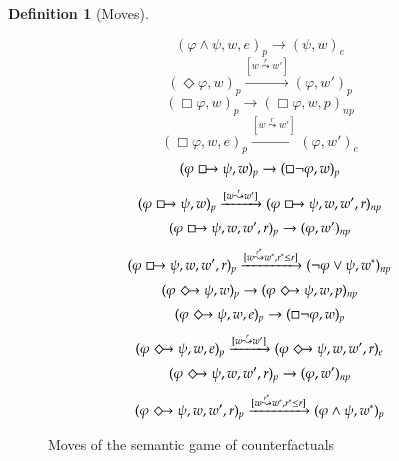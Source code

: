 \documentclass[a4paper,american]{paper}
\theoremstyle{definition}\newtheorem{definition}{Definition}
\begin{document}
\begin{definition}[Moves]
\begin{figure}[H]
	\begin{equation}
		(\varphi\wedge\psi ,w,e)_{p}\rightarrow (\psi ,w)_{e}
	\end{equation}
	\begin{equation}
		(\Diamond\varphi ,w)_{p}\xrightarrow{[w\overset{r}{\leadsto}w']} (\varphi ,w')_{p}
	\end{equation}
	\begin{equation}
		(\Box\varphi ,w)_{p}\rightarrow (\Box\varphi ,w,p)_{np}
	\end{equation}
	\begin{equation}
		(\Box\varphi ,w,e)_{p}\xrightarrow{[w\overset{r}{\leadsto}w']} (\varphi ,w')_{e}
	\end{equation}
	\begin{equation}
		(\varphi\boxright\psi ,w)_p\rightarrow (\Box\neg\varphi ,w)_{p}
	\end{equation}
	\begin{equation}
		(\varphi\boxright\psi ,w)_p\xrightarrow{[w\overset{r}{\leadsto}w']}(\varphi\boxright\psi ,w,w',r)_{np}
	\end{equation}
	\begin{equation}
		(\varphi\boxright\psi ,w,w',r)_p\rightarrow (\varphi ,w')_{np}
	\end{equation}
	\begin{equation}
		(\varphi\boxright\psi ,w,w',r)_p\xrightarrow{[w\overset{r^*}{\leadsto}w^*,r^*\leq r]}(\neg\varphi\vee\psi ,w^*)_{np}
	\end{equation}
	\begin{equation}
		(\varphi\Diamondright\psi ,w)_p\rightarrow (\varphi\Diamondright\psi ,w,p)_{np}
	\end{equation}
	\begin{equation}
		(\varphi\Diamondright\psi ,w,e)_{p}\rightarrow (\Box\neg\varphi ,w)_{p}
	\end{equation}
	\begin{equation}
		(\varphi\Diamondright\psi ,w,e)_p\xrightarrow{[w\overset{r}{\leadsto}w']}(\varphi\Diamondright\psi ,w,w',r)_{e}
	\end{equation}
	\begin{equation}
		(\varphi\Diamondright\psi ,w,w',r)_p\rightarrow (\varphi ,w')_{np}
	\end{equation}
	\begin{equation}
		(\varphi\Diamondright\psi ,w,w',r)_p\xrightarrow{[w\overset{r^*}{\leadsto}w^*,r^*\leq r]}(\varphi\wedge\psi ,w^*)_{p}
	\end{equation}
	\caption{Moves of the semantic game of counterfactuals}
	\label{fig:moves}
\end{figure}
\end{definition}
\end{document}
